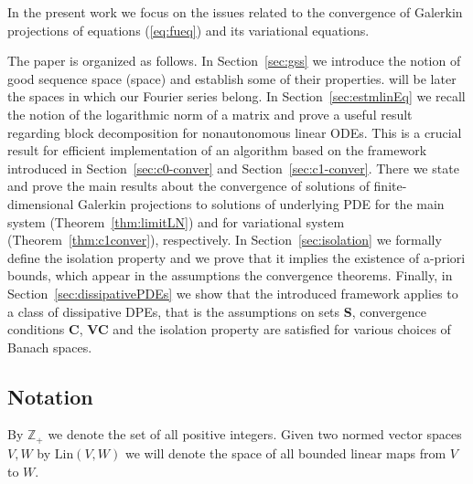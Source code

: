 In the present work we focus on the issues related to the convergence of Galerkin projections of equations (\ref{eq:fueq}) and its variational equations.

The paper is organized as follows. In Section~\ref{sec:gss} we introduce the notion of good sequence space (\gss space) and  establish some of their properties.  \gss will be later the spaces in which our Fourier series belong. In Section~\ref{sec:estmlinEq} we recall the notion of the logarithmic norm of a matrix and prove a useful result regarding block decomposition for nonautonomous linear ODEs. This is a crucial result for efficient implementation of an algorithm based on the framework introduced in Section~\ref{sec:c0-conver} and Section~\ref{sec:c1-conver}. There we state and prove the main results about the convergence of solutions of finite-dimensional Galerkin projections to solutions of underlying PDE for the main system (Theorem~\ref{thm:limitLN}) and for variational system (Theorem~\ref{thm:c1conver}), respectively. In Section~\ref{sec:isolation} we formally define the isolation property and we prove that it implies the existence of a-priori bounds, which appear in the assumptions the convergence theorems. Finally, in Section~\ref{sec:dissipativePDEs} we show that the introduced framework applies to a class of dissipative DPEs, that is the assumptions on sets \textbf{S}, convergence conditions \textbf{C}, \textbf{VC} and the isolation property are satisfied for various choices of Banach spaces.


\subsection*{Notation}


By $\mathbb{Z}_+$ we denote the set of all positive integers.
Given two normed vector spaces $V,W$ by $\text{Lin}(V,W)$ we will denote the space of all bounded linear maps from $V$ to $W$.





